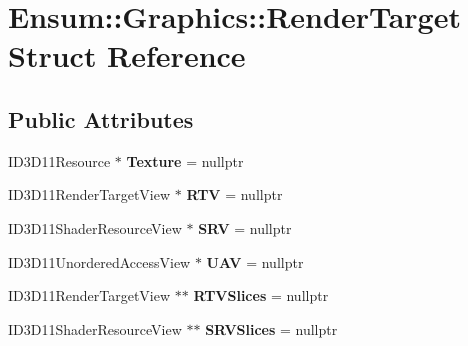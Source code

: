 \hypertarget{struct_ensum_1_1_graphics_1_1_render_target}{}\section{Ensum\+:\+:Graphics\+:\+:Render\+Target Struct Reference}
\label{struct_ensum_1_1_graphics_1_1_render_target}
\subsection*{Public Attributes}
\begin{DoxyCompactItemize}
\item 
I\+D3\+D11\+Resource $\ast$ {\bfseries Texture} = nullptr\hypertarget{struct_ensum_1_1_graphics_1_1_render_target_ad4052d607c6775f4b4a9610880240e95}{}\label{struct_ensum_1_1_graphics_1_1_render_target_ad4052d607c6775f4b4a9610880240e95}

\item 
I\+D3\+D11\+Render\+Target\+View $\ast$ {\bfseries R\+TV} = nullptr\hypertarget{struct_ensum_1_1_graphics_1_1_render_target_a150d9f216a511dcd7b618e844ffea07f}{}\label{struct_ensum_1_1_graphics_1_1_render_target_a150d9f216a511dcd7b618e844ffea07f}

\item 
I\+D3\+D11\+Shader\+Resource\+View $\ast$ {\bfseries S\+RV} = nullptr\hypertarget{struct_ensum_1_1_graphics_1_1_render_target_aab964884c66eb48bd47b6a5002b7be75}{}\label{struct_ensum_1_1_graphics_1_1_render_target_aab964884c66eb48bd47b6a5002b7be75}

\item 
I\+D3\+D11\+Unordered\+Access\+View $\ast$ {\bfseries U\+AV} = nullptr\hypertarget{struct_ensum_1_1_graphics_1_1_render_target_a39d871cac6b55eadaed7ca40216f98e3}{}\label{struct_ensum_1_1_graphics_1_1_render_target_a39d871cac6b55eadaed7ca40216f98e3}

\item 
I\+D3\+D11\+Render\+Target\+View $\ast$$\ast$ {\bfseries R\+T\+V\+Slices} = nullptr\hypertarget{struct_ensum_1_1_graphics_1_1_render_target_afcb061b38ef95e6466f8a5552ee5cb86}{}\label{struct_ensum_1_1_graphics_1_1_render_target_afcb061b38ef95e6466f8a5552ee5cb86}

\item 
I\+D3\+D11\+Shader\+Resource\+View $\ast$$\ast$ {\bfseries S\+R\+V\+Slices} = nullptr\hypertarget{struct_ensum_1_1_graphics_1_1_render_target_afd021f57acf98cdc1ca44ae41718de09}{}\label{struct_ensum_1_1_graphics_1_1_render_target_afd021f57acf98cdc1ca44ae41718de09}


\end{DoxyCompactItemize}
